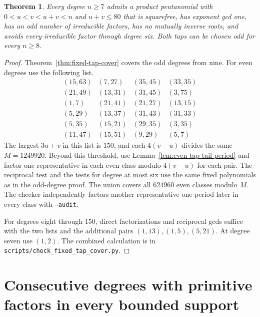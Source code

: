 \documentclass[11pt]{article}
\newtheorem{theorem}{Theorem}
\begin{document}
\begin{theorem}\label{thm:fixed-tap-all-cover}
Every degree \(n\ge7\) admits a product pentanomial with
\(0<u<v<u+v<n\) and \(u+v\le80\) that is squarefree, has
exponent gcd one, has an odd number of irreducible factors,
has no mutually inverse roots, and avoids every irreducible factor
through degree six. Both taps can be chosen odd for every \(n\ge8\).
\end{theorem}
\begin{proof}
Theorem~\ref{thm:fixed-tap-cover} covers the odd degrees from nine.
For even degrees use the following list.
\[
\begin{array}{rrrr}
(15,63)&(7,27)&(35,45)&(33,35)\\
(21,49)&(13,31)&(31,45)&(3,75)\\
(1,7)&(21,41)&(21,27)&(13,15)\\
(5,29)&(13,37)&(31,43)&(31,33)\\
(5,35)&(15,21)&(29,35)&(3,35)\\
(11,47)&(15,51)&(9,29)&(5,7)
\end{array}
\]
The largest \(3u+v\) in this list is \(150\), and each
\(4(v-u)\) divides the same \(M=1249920\). Beyond this threshold,
use Lemma~\ref{lem:even-tap-tail-period} and factor one
representative in each even class modulo \(4(v-u)\) for each pair.
The reciprocal test and the tests for degree at most six use the
same fixed polynomials as in the odd-degree proof.
The union covers all \(624960\) even classes modulo \(M\).
The checker independently factors another representative one period
later in every class with \texttt{--audit}.

For degrees eight through \(150\), direct factorizations and
reciprocal gcds suffice with the two lists and the additional pairs
\((1,13),(1,5),(5,21)\). At degree seven use \((1,2)\).
The combined calculation is in
\nolinkurl{scripts/check_fixed_tap_cover.py}.
\end{proof}

\section{Consecutive degrees with primitive factors in every bounded support}
\label{sec:primitive-factor-block}
\end{document}
